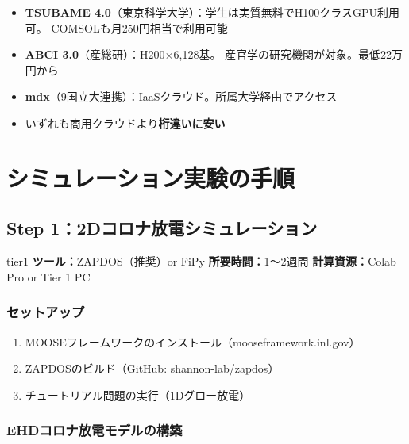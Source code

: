 \documentclass[12pt,a4paper]{ltjsarticle}
\begin{document}
\begin{successbox}[大学・研究機関所属者は圧倒的に有利]
\begin{itemize}[leftmargin=2em]
  \item \textbf{TSUBAME 4.0}（東京科学大学）：学生は実質無料でH100クラスGPU利用可。
        COMSOLも月250円相当で利用可能
  \item \textbf{ABCI 3.0}（産総研）：H200$\times$6,128基。
        産官学の研究機関が対象。最低22万円から
  \item \textbf{mdx}（9国立大連携）：IaaSクラウド。所属大学経由でアクセス
  \item いずれも商用クラウドより\textbf{桁違いに安い}
\end{itemize}
\end{successbox}

\newpage
\section{シミュレーション実験の手順}

\subsection{Step 1：2Dコロナ放電シミュレーション}

\begin{tierbox}{tier1}
\textbf{ツール：}ZAPDOS（推奨）or FiPy \quad
\textbf{所要時間：}1〜2週間 \quad
\textbf{計算資源：}Colab Pro or Tier 1 PC
\end{tierbox}

\subsubsection{セットアップ}

\begin{enumerate}[leftmargin=2em]
  \item MOOSEフレームワークのインストール（mooseframework.inl.gov）
  \item ZAPDOSのビルド（GitHub: shannon-lab/zapdos）
  \item チュートリアル問題の実行（1Dグロー放電）
\end{enumerate}

\subsubsection{EHDコロナ放電モデルの構築}
\end{document}
